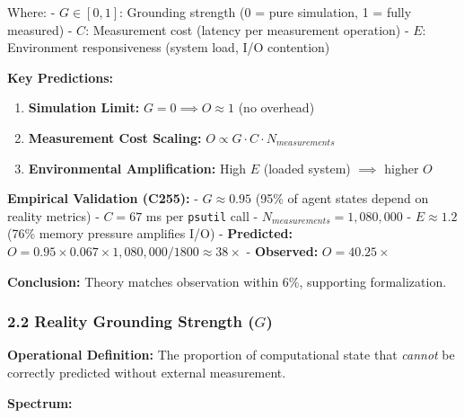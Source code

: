 \documentclass[
]{article}
\providecommand{\tightlist}{%
  \setlength{\itemsep}{0pt}\setlength{\parskip}{0pt}}
\begin{document}
Where: - \(G \in [0, 1]\): Grounding strength (0 = pure simulation, 1 =
fully measured) - \(C\): Measurement cost (latency per measurement
operation) - \(E\): Environment responsiveness (system load, I/O
contention)

\textbf{Key Predictions:}

\begin{enumerate}
\def\labelenumi{\arabic{enumi}.}
\tightlist
\item
  \textbf{Simulation Limit:} \(G = 0 \implies O \approx 1\) (no
  overhead)
\item
  \textbf{Measurement Cost Scaling:}
  \(O \propto G \cdot C \cdot N_{measurements}\)
\item
  \textbf{Environmental Amplification:} High \(E\) (loaded system)
  \(\implies\) higher \(O\)
\end{enumerate}

\textbf{Empirical Validation (C255):} - \(G \approx 0.95\) (95\% of
agent states depend on reality metrics) - \(C = 67\) ms per
\texttt{psutil} call - \(N_{measurements} = 1,080,000\) -
\(E \approx 1.2\) (76\% memory pressure amplifies I/O) -
\textbf{Predicted:}
\(O = 0.95 \times 0.067 \times 1,080,000 / 1800 \approx 38×\) -
\textbf{Observed:} \(O = 40.25×\)

\textbf{Conclusion:} Theory matches observation within 6\%, supporting
formalization.

\subsubsection{\texorpdfstring{2.2 Reality Grounding Strength
(\(G\))}{2.2 Reality Grounding Strength (G)}}\label{reality-grounding-strength-g}

\textbf{Operational Definition:} The proportion of computational state
that \emph{cannot} be correctly predicted without external measurement.

\textbf{Spectrum:}
\end{document}
